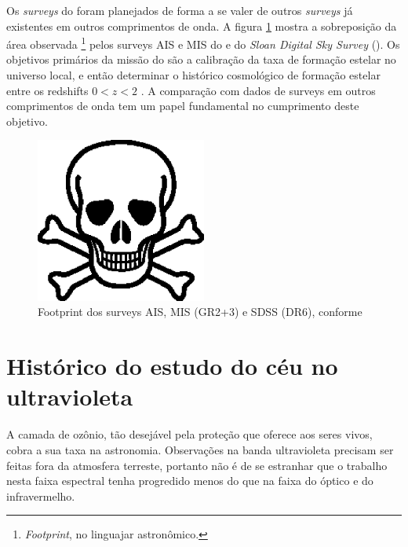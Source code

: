 Os {\em surveys} do \galex{} foram planejados de forma a se valer de outros {\em
surveys} já existentes em outros comprimentos de onda. A figura
\ref{fig:GalexSDSSOverlap} mostra a sobreposição da área observada
\footnote{{\em Footprint}, no linguajar astronômico.} pelos surveys AIS e MIS do
\galex{} e do {\em Sloan Digital Sky Survey} (\SDSS). Os objetivos primários da
missão do \galex{} são a calibração da taxa de formação estelar no universo
local, e então determinar o histórico cosmológico de formação estelar entre os
redshifts $0 < z < 2$ \citep{Martin2005}. A comparação com dados de surveys em
outros comprimentos de onda tem um papel fundamental no cumprimento deste
objetivo.

\begin{figure}
	\includegraphics[width=0.5\textwidth]{figuras/test.eps}
	\caption[Footprint dos surveys \galex AIS, MIS e SDSS]
	{Footprint dos surveys \galex AIS, MIS (GR2+3) e SDSS (DR6),
	conforme \cite{Budavari2009}}
	\label{fig:GalexSDSSOverlap}
\end{figure}




\section{Histórico do estudo do céu no ultravioleta}
\label{sec:Galex:CeuUV}

A camada de ozônio, tão desejável pela proteção que oferece aos seres vivos,
cobra a sua taxa na astronomia. Observações na banda ultravioleta precisam ser
feitas fora da atmosfera terreste, portanto não é de se estranhar que o trabalho
nesta faixa espectral tenha progredido menos do que na faixa do óptico e do
infravermelho.\citneed


